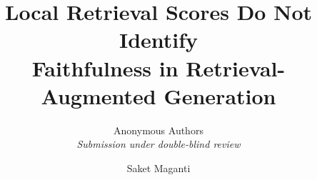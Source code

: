 \documentclass[10pt]{article}
\title{\Large\bfseries Local Retrieval Scores Do Not Identify\\[0.2em]
Faithfulness in Retrieval-Augmented Generation}
\author{Anonymous Authors\\\textit{Submission under double-blind review}}
\author{Saket Maganti}
\date{}
\theoremstyle{plain}
\theoremstyle{definition}
\begin{document}
\maketitle

\begin{abstract}

\end{abstract}











{\footnotesize


}
\end{document}
